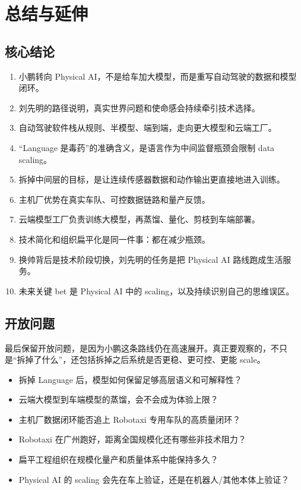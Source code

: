 \section{总结与延伸}

\subsection{核心结论}

\begin{enumerate}
\item 小鹏转向 Physical AI，不是给车加大模型，而是重写自动驾驶的数据和模型闭环。
\item 刘先明的路径说明，真实世界问题和使命感会持续牵引技术选择。
\item 自动驾驶软件栈从规则、半模型、端到端，走向更大模型和云端工厂。
\item “Language 是毒药”的准确含义，是语言作为中间监督瓶颈会限制 data scaling。
\item 拆掉中间层的目标，是让连续传感器数据和动作输出更直接地进入训练。
\item 主机厂优势在真实车队、可控数据链路和量产反馈。
\item 云端模型工厂负责训练大模型，再蒸馏、量化、剪枝到车端部署。
\item 技术简化和组织扁平化是同一件事：都在减少瓶颈。
\item 换帅背后是技术阶段切换，刘先明的任务是把 Physical AI 路线跑成生活服务。
\item 未来关键 bet 是 Physical AI 中的 scaling，以及持续识别自己的思维误区。
\end{enumerate}

\subsection{开放问题}

最后保留开放问题，是因为小鹏这条路线仍在高速展开。真正要观察的，不只是“拆掉了什么”，还包括拆掉之后系统是否更稳、更可控、更能 scale。

\begin{itemize}
\item 拆掉 Language 后，模型如何保留足够高层语义和可解释性？
\item 云端大模型到车端模型的蒸馏，会不会成为体验上限？
\item 主机厂数据闭环能否追上 Robotaxi 专用车队的高质量闭环？
\item Robotaxi 在广州跑好，距离全国规模化还有哪些非技术阻力？
\item 扁平工程组织在规模化量产和质量体系中能保持多久？
\item Physical AI 的 scaling 会先在车上验证，还是在机器人/其他本体上验证？
\end{itemize}

